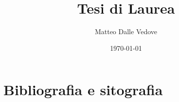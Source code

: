 \documentclass[10pt,a4paper]{article}
\title{Tesi di Laurea}
\author{Matteo Dalle Vedove}
\date{\today}
\begin{document}
	
	\maketitle
	
	\tableofcontents
	
	\newpage
	
	
	\newpage
	
	
	\newpage
	
	
	\newpage
	
	
	\newpage
	
	
	\newpage
	\section{Bibliografia e sitografia}
	\printbibliography[heading=none]
		
\end{document}
